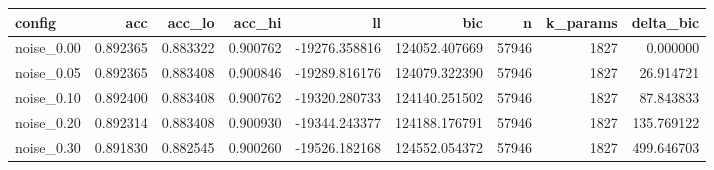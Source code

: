 \begin{tabular}{lrrrrrrrr}
\toprule
config & acc & acc\_lo & acc\_hi & ll & bic & n & k\_params & delta\_bic \\
\midrule
noise\_0.00 & 0.892365 & 0.883322 & 0.900762 & -19276.358816 & 124052.407669 & 57946 & 1827 & 0.000000 \\
noise\_0.05 & 0.892365 & 0.883408 & 0.900846 & -19289.816176 & 124079.322390 & 57946 & 1827 & 26.914721 \\
noise\_0.10 & 0.892400 & 0.883408 & 0.900762 & -19320.280733 & 124140.251502 & 57946 & 1827 & 87.843833 \\
noise\_0.20 & 0.892314 & 0.883408 & 0.900930 & -19344.243377 & 124188.176791 & 57946 & 1827 & 135.769122 \\
noise\_0.30 & 0.891830 & 0.882545 & 0.900260 & -19526.182168 & 124552.054372 & 57946 & 1827 & 499.646703 \\
\bottomrule
\end{tabular}
